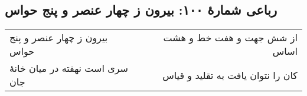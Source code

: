 \begin{center}
\section*{رباعی شمارهٔ ۱۰۰:  بیرون ز چهار عنصر و پنج حواس}
\label{sec:100}
\begin{longtable}{l p{0.5cm} r}
 بیرون ز چهار عنصر و پنج حواس
&&
از شش جهت و هفت خط و هشت اساس
\\
سری است نهفته در میان خانهٔ جان
&&
کان را نتوان یافت به تقلید و قیاس
\\
\end{longtable}
\end{center}
